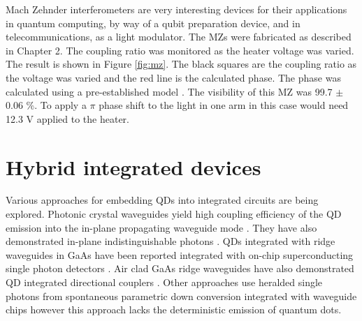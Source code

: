 Mach Zehnder interferometers are very interesting devices for their applications
in quantum computing, by way of a qubit preparation device, and in
telecommunications, as a light modulator. The MZs were fabricated as described
in Chapter 2. The coupling ratio was monitored as the heater voltage was varied.
The result is shown in Figure \ref{fig:mz}. The black squares are the coupling
ratio as the voltage was varied and the red line is the calculated phase. The
phase was calculated using a pre-established model
\cite{matthews2009manipulation}. The visibility of this MZ was 99.7 $\pm$ 0.06 \%.
To apply a $\pi$ phase shift to the light in one arm in this case would need
12.3 V applied to the heater.

\section{Hybrid integrated devices}

Various approaches for embedding QDs into integrated circuits are being
explored. Photonic crystal waveguides yield high coupling efficiency of the QD
emission into the in-plane propagating waveguide mode \cite{schwagmann2011chip}.
They have also demonstrated in-plane indistinguishable photons
\cite{kalliakos2014plane}. QDs integrated with ridge waveguides in GaAs have
been reported integrated with on-chip superconducting single photon detectors
\cite{reithmaier2013chip}. Air clad GaAs ridge waveguides have also demonstrated
QD integrated directional couplers \cite{prtljaga2014, jons2014monolithic}.
Other approaches use heralded single photons from spontaneous parametric down
conversion integrated with waveguide chips \cite{meany2014hybrid} however this
approach lacks the deterministic emission of quantum dots.

